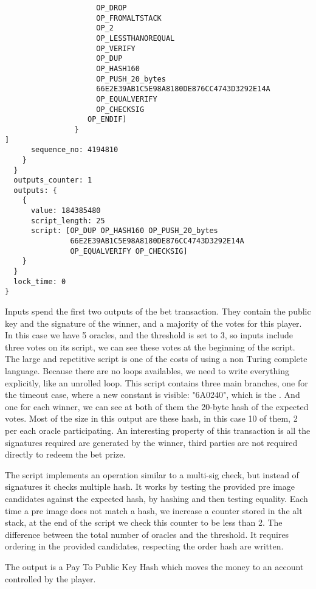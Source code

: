 \begin{lstlisting}
                     OP_DROP
                     OP_FROMALTSTACK
                     OP_2
                     OP_LESSTHANOREQUAL
                     OP_VERIFY
                     OP_DUP
                     OP_HASH160
                     OP_PUSH_20_bytes
                     66E2E39AB1C5E98A8180DE876CC4743D3292E14A
                     OP_EQUALVERIFY
                     OP_CHECKSIG
                   OP_ENDIF]
                }
]
      sequence_no: 4194810
    }
  }
  outputs_counter: 1
  outputs: {
    {
      value: 184385480
      script_length: 25
      script: [OP_DUP OP_HASH160 OP_PUSH_20_bytes
               66E2E39AB1C5E98A8180DE876CC4743D3292E14A
               OP_EQUALVERIFY OP_CHECKSIG]
    }
  }
  lock_time: 0
}
\end{lstlisting}

Inputs spend the first two outputs of the bet transaction.
They contain the public key and the signature of the winner, and a majority
  of the votes for this player.
In this case we have 5 oracles, and the threshold is set to 3, so inputs include
  three votes on its script, we can see these votes at the beginning of the
  script.
The large and repetitive script is one of the costs of using a non Turing
  complete language.
Because there are no loops availables, we need to write everything explicitly,
  like an unrolled loop.
This script contains three main branches, one for the timeout case, where a new
  constant is visible: "6A0240", which is the .
And one for each winner, we can see at both of them the 20-byte hash of the
  expected votes.
Most of the size in this output are these hash, in this case 10 of them, 2 per
  each oracle participating.
An interesting property of this transaction is all the signatures required are
  generated by the winner, third parties are not required directly to redeem
  the bet prize.

The script implements an operation similar to a multi-sig check, but instead
  of signatures it checks multiple hash.
It works by testing the provided pre image candidates against the expected
  hash, by hashing and then testing equality.
Each time a pre image does not match a hash, we increase a counter stored in the
  alt stack, at the end of the script we check this counter to be less than 2.
The difference between the total number of oracles and the threshold.
It requires ordering in the provided candidates, respecting the order hash are
  written.

The output is a Pay To Public Key Hash which moves the money to an account
  controlled by the player.
